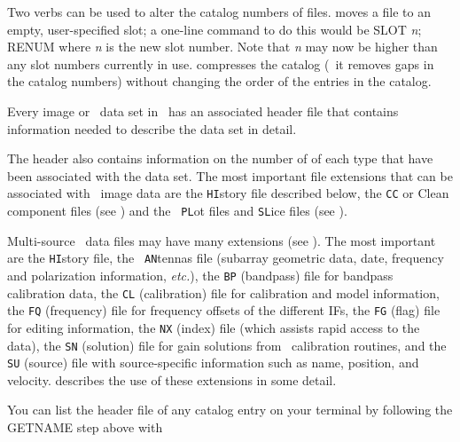      Two verbs can be used to alter the catalog numbers of files.
{\tt {}} moves a file to an empty, user-specified slot; a
one-line command to do this would be {\us SLOT {\it n\/}; RENUM \CR}
where {\it n\/} is the new slot number.  Note that {\it n\/} may now
be higher than any slot numbers currently in use.  {\tt {}}
compresses the catalog (\ie\ it removes gaps in the catalog numbers)
without changing the order of the entries in the catalog.


     Every image or \uv\ data set in \AIPS\ has an associated header
file that contains information needed to describe the data set in
detail.

     The header also contains information on the number of
 of each type that have been associated with the
data set.  The most important file extensions that can be associated
with \AIPS\ image data are the {\tt HI}story file described below, the
{\tt CC} or Clean component files (see ) and the {\tt
PL}ot files and {\tt SL}ice files (see ).

     Multi-source \uv\ data files may have many extensions (see
).  The most important are the {\tt HI}story file, the {\tt
AN}tennas file (subarray geometric data, date, frequency and
polarization information, {\it etc.\/}), the {\tt BP} (bandpass) file
for bandpass calibration data, the {\tt CL} (calibration) file for
calibration and model information, the {\tt FQ} (frequency) file for
frequency offsets of the different IFs, the {\tt FG} (flag) file for
editing information, the {\tt NX} (index) file (which assists rapid
access to the data), the {\tt SN} (solution) file for gain solutions
from \AIPS\ calibration routines, and the {\tt SU} (source) file with
source-specific information such as name, position, and velocity.
 describes the use of these extensions in some detail.

     You can list the header file of any catalog entry on your
terminal by following the {\us GETNAME} step above with\
\btd
{}
\etd
{}

